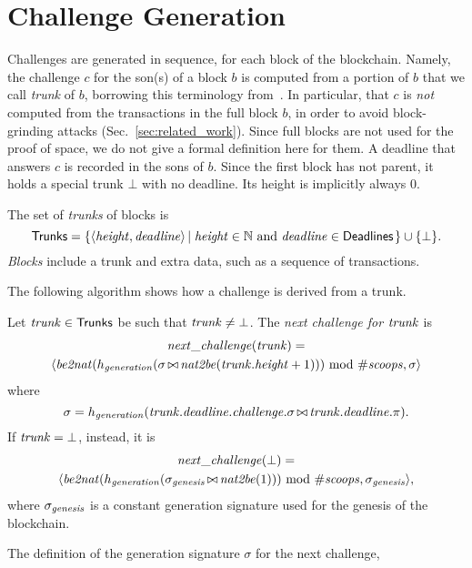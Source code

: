 \section{Challenge Generation}\label{sec:challenge_generation}
%
Challenges are generated in sequence, for each block of the blockchain.
Namely, the challenge $c$ for the son(s) of a block $b$ is computed
from a portion of $b$ that we call \emph{trunk} of $b$, borrowing this terminology
from~\cite{CohenP19}. In particular, that $c$ is \emph{not}
computed from the transactions in the full block $b$,
in order to avoid block-grinding attacks (Sec.~\ref{sec:related_work}).
Since full blocks are not used for the proof of space, we do not give
a formal definition here for them. A deadline that answers $c$
is recorded in the sons of $b$. Since the first block has not parent, it holds
a special trunk $\bot$ with no deadline. Its height is implicitly always $0$.
%
\begin{definition}\label{def:block}
  The set of \emph{trunks} of blocks is
  \[
  {\mathsf{Trunks}}=\left\{\langle{\mathit{height}},{\mathit{deadline}}\rangle\left|\;{\mathit{height}}\in\mathbb{N}\text{ and }{\mathit{deadline}}\in{\mathsf{Deadlines}}\right.\right\}\cup\{\bot\}.
  \]
  \emph{Blocks} include a trunk and extra data, such as a sequence of transactions.
\end{definition}
%
The following algorithm shows how a challenge is derived from a trunk.
%
\begin{alg}[$\nextchallenge(\trunk)$]\label{alg:next_challenge_from_trunk}
  Let ${\mathit{trunk}}\in{\mathsf{Trunks}}$ be such that ${\mathit{trunk}}\not=\bot$. The \emph{next challenge for ${\mathit{trunk}}$} is
  \begin{multline*}
    {\mathit{next\_challenge}}({\mathit{trunk}})=\\
    \langle{\mathit{be2nat}}(h_{\mathit{generation}}(\sigma\operatorname*{\bowtie}{\mathit{nat2be}}({\mathit{trunk}}.{\mathit{height}}+1)))\text{ mod }{\#\mathit{scoops}},\sigma\rangle
  \end{multline*}
  where
  \[
  \sigma=h_{\mathit{generation}}({\mathit{trunk}}.{\mathit{deadline}}.{\mathit{challenge}}.\sigma\operatorname*{\bowtie}{\mathit{trunk}}.{\mathit{deadline}}.\pi).  
  \]
  If ${\mathit{trunk}}=\bot$, instead, it is
  \begin{multline*}
    {\mathit{next\_challenge}}(\bot)=\\
    \langle{\mathit{be2nat}}(h_{\mathit{generation}}(\sigma_{\mathit{genesis}}\operatorname*{\bowtie}{\mathit{nat2be}}(1)))\text{ mod }{\#\mathit{scoops}},\sigma_{\mathit{genesis}}\rangle,
  \end{multline*}
  where $\sigma_{\mathit{genesis}}$ is a constant generation signature used for the genesis of the blockchain.
\end{alg}
%
The definition of the generation signature $\sigma$ for the next challenge,
